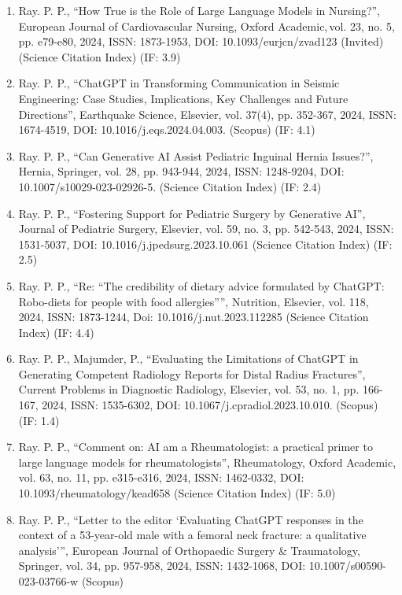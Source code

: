 \documentclass[11pt,a4paper]{moderncv}
\begin{document}
\begin{adjustwidth}{6em}{0pt}
\begin{enumerate}
		\item Ray. P. P., “How True is the Role of Large Language Models in Nursing?”, European Journal of Cardiovascular Nursing, Oxford Academic, vol. 23, no. 5, pp. e79-e80, 2024, ISSN: 1873-1953, DOI: 10.1093/eurjcn/zvad123 (Invited) (Science Citation Index) (IF: 3.9)
		
		\item Ray. P. P., “ChatGPT in Transforming Communication in Seismic Engineering: Case Studies, Implications, Key Challenges and Future Directions”, Earthquake Science, Elsevier, vol. 37(4), pp. 352-367, 2024, ISSN: 1674-4519, DOI: 10.1016/j.eqs.2024.04.003. (Scopus) (IF: 4.1)
		
		\item Ray. P. P., “Can Generative AI Assist Pediatric Inguinal Hernia Issues?”, Hernia, Springer, vol. 28, pp. 943-944, 2024, ISSN: 1248-9204, DOI: 10.1007/s10029-023-02926-5. (Science Citation Index) (IF: 2.4)
		
		\item Ray. P. P., “Fostering Support for Pediatric Surgery by Generative AI”, Journal of Pediatric Surgery, Elsevier, vol. 59, no. 3, pp. 542-543, 2024, ISSN: 1531-5037, DOI: 10.1016/j.jpedsurg.2023.10.061 (Science Citation Index) (IF: 2.5)
		
		\item Ray. P. P., “Re: “The credibility of dietary advice formulated by ChatGPT: Robo-diets for people with food allergies””, Nutrition, Elsevier, vol. 118, 2024, ISSN: 1873-1244, Doi: 10.1016/j.nut.2023.112285 (Science Citation Index) (IF: 4.4)
		
		\item Ray. P. P., Majumder, P., “Evaluating the Limitations of ChatGPT in Generating Competent Radiology Reports for Distal Radius Fractures”, Current Problems in Diagnostic Radiology, Elsevier, vol. 53, no. 1, pp. 166-167, 2024, ISSN: 1535-6302, DOI: 10.1067/j.cpradiol.2023.10.010. (Scopus) (IF: 1.4)
		
		\item Ray. P. P., “Comment on: AI am a Rheumatologist: a practical primer to large language models for rheumatologists”, Rheumatology, Oxford Academic, vol. 63, no. 11, pp. e315-e316, 2024, ISSN: 1462-0332, DOI: 10.1093/rheumatology/kead658 (Science Citation Index) (IF: 5.0)
		
		\item Ray. P. P., “Letter to the editor ‘Evaluating ChatGPT responses in the context of a 53-year-old male with a femoral neck fracture: a qualitative analysis’”, European Journal of Orthopaedic Surgery \& Traumatology, Springer, vol. 34, pp. 957-958, 2024, ISSN: 1432-1068, DOI: 10.1007/s00590-023-03766-w (Scopus) 
		

\end{enumerate}
\end{adjustwidth}
\end{document}
